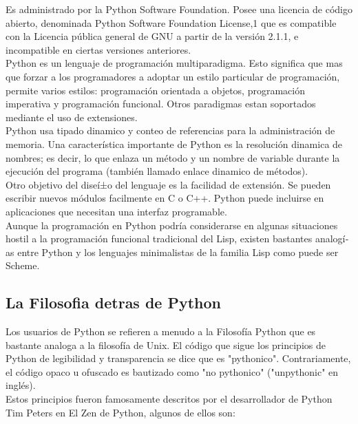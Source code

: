 Es administrado por la Python Software Foundation. Posee una licencia de código abierto, denominada Python Software Foundation License,1 que es compatible con la Licencia pública general de GNU a partir de la versión 2.1.1, e incompatible en ciertas versiones anteriores. \\[0.1cm]

Python es un lenguaje de programación multiparadigma. Esto significa que mas que forzar a los programadores a adoptar un estilo particular de programación, permite varios estilos: programación orientada a objetos, programación imperativa y programación funcional. Otros paradigmas estan soportados mediante el uso de extensiones. \\[0.1cm]

Python usa tipado dinamico y conteo de referencias para la administración de memoria. Una caracterí­stica importante de Python es la resolución dinamica de nombres;  es decir, lo que enlaza un método y un nombre de variable durante la ejecución  del programa (también llamado enlace dinamico de métodos). \\[0.1cm]
  
Otro objetivo del diseí±o del lenguaje es la facilidad de extensión. Se pueden escribir nuevos módulos facilmente en C o C++. Python puede incluirse en aplicaciones que necesitan una interfaz programable. \\[0.1cm]

Aunque la programación en Python podrí­a considerarse en algunas situaciones hostil a la programación funcional tradicional del Lisp, existen bastantes analogí­as entre Python y los lenguajes minimalistas de la familia Lisp como puede ser Scheme. \\[0.1cm]


\subsection{La Filosofia detras de Python}

Los usuarios de Python se refieren a menudo a la Filosofí­a Python que es bastante analoga a la filosofí­a de Unix. El código que sigue los principios de Python de legibilidad y transparencia se dice que es "pythonico". Contrariamente, el código opaco u ofuscado es bautizado como "no pythonico" ("unpythonic" en inglés). \\[0.1cm]

Estos principios fueron famosamente descritos por el desarrollador de Python Tim Peters en El Zen de Python, algunos de ellos son: \\[0.1cm]

